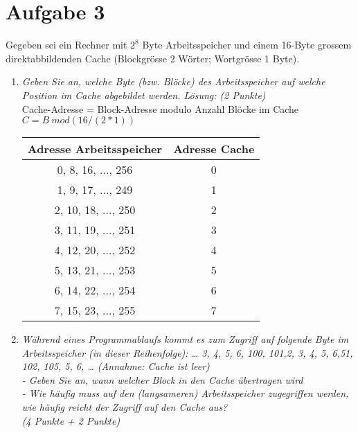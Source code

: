 \documentclass[10pt]{article}
\begin{document}
\section*{Aufgabe 3}
Gegeben sei ein Rechner mit $2^8$ Byte Arbeitsspeicher und einem 16-Byte grossem direktabbildenden Cache (Blockgrösse 2 Wörter; Wortgrösse 1 Byte).
\begin{enumerate}[label=\alph*)]
	\item
		\textit{Geben Sie an, welche Byte (bzw. Blöcke) des Arbeitsspeicher auf	welche Position im Cache abgebildet werden.	Lösung: (2 Punkte)}\\
		Cache-Adresse = Block-Adresse modulo Anzahl Blöcke im Cache \\
		$C = B  \: mod	(16/(2*1))$ \\
		\begin{tabular}{c | c}
		Adresse Arbeitsspeicher 	&	Adresse Cache \\
		\hline
		0, 8, 16, ..., 256	& 	0 \\
		1, 9, 17, ..., 249	& 	1 \\
		2, 10, 18, ...,	250	& 	2 \\
		3, 11, 19, ..., 251	&	3 \\
		4, 12, 20, ..., 252	& 	4 \\
		5, 13, 21, ..., 253	& 	5 \\
		6, 14, 22, ..., 254	&	6 \\
		7, 15, 23, ..., 255	&	7 \\
		\end{tabular}
	\item
		\textit{Während eines Programmablaufs kommt es zum Zugriff auf folgende Byte im Arbeitsspeicher (in dieser Reihenfolge): … 3, 4, 5, 6, 100, 101,2, 3, 4, 5, 6,51, 102, 105, 5, 6, … (Annahme: Cache ist leer) \\- Geben Sie an, wann welcher Block in den Cache übertragen wird \\- Wie häufig muss auf den (langsameren) Arbeitsspeicher zugegriffen werden, wie häufig reicht der Zugriff auf den Cache aus? \\(4 Punkte + 2 Punkte)}
		

\end{enumerate}
\end{document}
